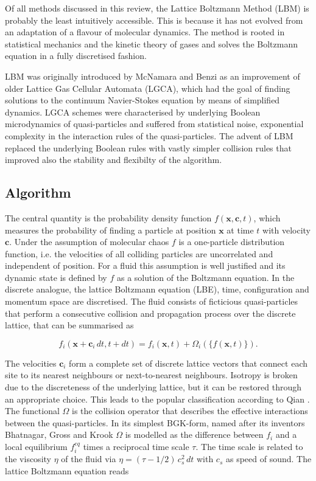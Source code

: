 \documentclass[8.5pt,twoside,twocolumn]{article}
\newcommand{\beq}{\begin{equation}}
\newcommand{\eeq}{\end{equation}}
\begin{document}
Of all methods discussed in this review, the Lattice Boltzmann Method (LBM) \cite{Succi:2001, Guo:2013} 
is probably the least intuitively accessible. 
This is because it has not evolved from an adaptation of a flavour of molecular dynamics. 
The method is rooted in statistical mechanics and the kinetic theory of gases and solves the Boltzmann equation
in a fully discretised fashion.

LBM was originally introduced by McNamara \cite{McNamara:1988} and 
Benzi \cite{Benzi:1992} as an improvement of older Lattice Gas Cellular Automata (LGCA),
which had the goal of finding solutions to the continuum Navier-Stokes equation by 
means of simplified dynamics. LGCA schemes were characterised by underlying Boolean
microdynamics of quasi-particles and suffered from statistical noise, exponential complexity
in the interaction rules of the quasi-particles. The advent of LBM replaced the underlying 
Boolean rules with vastly simpler collision rules that improved also the stability 
and flexibilty of the algorithm. 
 
\subsection{Algorithm}

The central quantity is the probability density function
$f(\mathbf{x}, \mathbf{c}, t)$, which measures the probability of finding
a particle at position $\mathbf{x}$ at time $t$ with velocity $\mathbf{c}$.
Under the assumption of molecular chaos $f$ is a one-particle distribution function,
i.e. the velocities of all colliding particles are uncorrelated and independent of position. 
For a fluid this assumption is well justified and its dynamic state is defined
by $f$ as a solution of the Boltzmann equation. 
In the discrete analogue, the lattice Boltzmann equation (LBE), time, configuration 
and momentum space are discretised. 
The fluid consists of ficticious quasi-particles that perform a consecutive 
collision and propagation process over the discrete lattice, that can be
summarised as

\beq\label{lbe}
f_i(\mathbf{x}+\mathbf{c}_i\, dt, t+dt)=f_i(\mathbf{x}, t)+\Omega_i(\{f(\mathbf{x},t)\}).
\eeq

The velocities $\mathbf{c}_i$ form a complete set of discrete lattice vectors that
connect each site to its nearest neighbours or next-to-nearest neighbours. 
Isotropy is broken due to the discreteness of the underlying lattice,  but it can be 
restored through an appropriate choice. This leads to the popular classification 
according to Qian \cite{Qian:1992}.
The functional $\Omega$ is the collision operator that describes the effective interactions 
between the quasi-particles. In its simplest BGK-form, named after its inventors
Bhatnagar, Gross and Krook  $\Omega$ is modelled as  
the difference between $f_i$ and a local equilibrium $f_i^{eq}$ times a reciprocal 
time scale $\tau$. The time scale is related to the viscosity $\eta$ of the fluid via 
$\eta =(\tau - 1/2)\,c_s^2\,dt$ with $c_s$ as speed of sound. The lattice Boltzmann
equation reads
\end{document}
